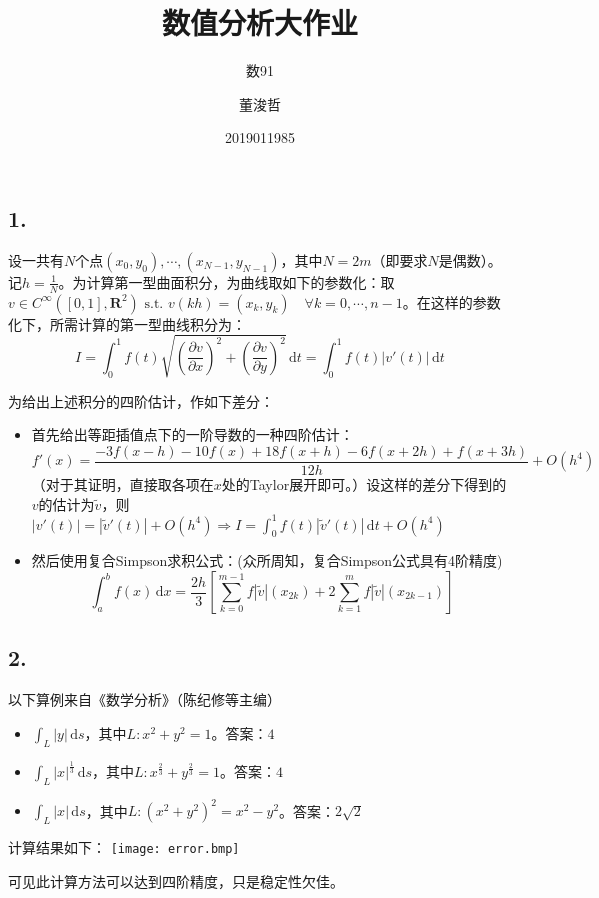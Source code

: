 \documentclass{ctexart}
\title{数值分析大作业}
\author{数91\and 董浚哲\and 2019011985}
\begin{document}
\maketitle
\newcommand{\R}{\mathbf{R}}
\newcommand{\dd}{\,\mathrm{d}}
\newcommand{\st}{\text{ s.t. }}
\newcommand{\pp}[2]{\frac{\partial #1}{\partial #2}}
\newcommand{\nm}[1]{\left\|#1\right\|}

\subsection*{1.}
设一共有$N$个点$(x_0,y_0),\cdots,(x_{N-1},y_{N-1})$，其中$N=2m$（即要求$N$是偶数）。记$h=\frac{1}{N}$。为计算第一型曲面积分，为曲线取如下的参数化：取$v\in C^\infty([0,1],\R^2) \st v(kh)=(x_k,y_k)\quad\forall k=0,\cdots,n-1$。在这样的参数化下，所需计算的第一型曲线积分为：
\[I=\int_0^1 f(t)\sqrt{(\pp{v}{x})^2+(\pp{v}{y})^2}\dd t=\int_0^1 f(t)|v'(t)|\dd t\]

为给出上述积分的四阶估计，作如下差分：
\begin{itemize}
\item 首先给出等距插值点下的一阶导数的一种四阶估计：
\[f'(x)=\frac{-3f(x-h)-10f(x)+18f(x+h)-6f(x+2h)+f(x+3h)}{12h}+O(h^4)\]
（对于其证明，直接取各项在$x$处的Taylor展开即可。）设这样的差分下得到的$v$的估计为$\tilde{v}$，则$|v'(t)|=|\tilde{v}'(t)|+O(h^4)\Rightarrow I=\int_0^1f(t)|\tilde{v}'(t)|\dd t+O(h^4)$

\item 然后使用复合Simpson求积公式：(众所周知，复合Simpson公式具有4阶精度)
  \[ \int_a^b f(x)\dd x = \frac{2h}{3}[\sum_{k=0}^{m-1}f|\tilde{v}|(x_{2k})+2\sum_{k=1}^mf|\tilde{v}|(x_{2k-1})]\]

\end{itemize}

\subsection*{2.}

以下算例来自《数学分析》（陈纪修等主编）
\begin{itemize}
\item $\int_{L}|y|\dd s$，其中$L:x^2+y^2=1$。答案：$4$
\item $\int_L |x|^{\frac{1}{3}}\dd s$，其中$L:x^{\frac{2}{3}}+y^{\frac{2}{3}}=1$。答案：$4$
\item $\int_L|x|\dd s$，其中$L:(x^2+y^2)^2=x^2-y^2$。答案：$2\sqrt{2}$
\end{itemize}
计算结果如下：
\texttt{[image: error.bmp]}

可见此计算方法可以达到四阶精度，只是稳定性欠佳。
\end{document}
